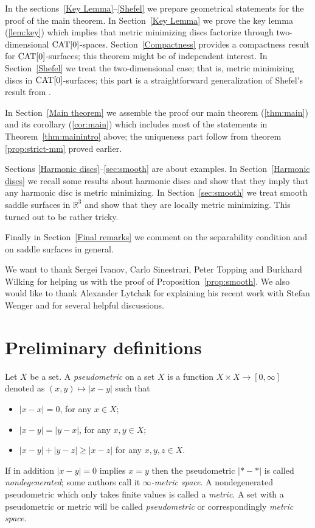 \documentclass{article}
\begin{document}
In the sections~\ref{Key Lemma}--\ref{Shefel} we prepare geometrical statements for the proof of the main theorem.
In Section~\ref{Key Lemma} we prove the key lemma (\ref{lem:key}) which implies that metric minimizing discs factorize through 
two-dimensional $\mathop{\rm CAT}\nolimits[0]$-spaces. 
Section~\ref{Compactness} provides a compactness result for $\mathop{\rm CAT}\nolimits[0]$-surfaces;
this theorem might be of independent interest. 
In Section~\ref{Shefel} we treat the two-dimensional case; 
that is, metric minimizing discs in $\mathop{\rm CAT}\nolimits[0]$-surfaces;
this part is a straightforward generalization of Shefel's result from \cite{shefel-2D}. 

In Section~\ref{Main theorem} we assemble the proof our main theorem (\ref{thm:main}) and its corollary (\ref{cor:main}) 
which includes most of the statements in Theorem~\ref{thm:mainintro} above; the uniqueness part follow from theorem \ref{prop:strict-mm} 
proved earlier.

Sections \ref{Harmonic discs}--\ref{sec:smooth} are about examples.
In Section~\ref{Harmonic discs} we recall some results about  harmonic discs and show that they imply that any harmonic disc is metric minimizing. 
In Section~\ref{sec:smooth} we treat smooth saddle surfaces in $\mathbb{R}^3$ and show that they are locally metric minimizing.
This turned out to be rather tricky.

Finally in Section~\ref{Final remarks} we comment on the separability condition and on saddle 
surfaces in general.

We want to thank 
Sergei Ivanov, 
Carlo Sinestrari, 
Peter Topping 
and Burkhard Wilking 
for helping us with the proof of Proposition~\ref{prop:smooth}.
We also would like to thank Alexander Lytchak for explaining his recent work with Stefan Wenger and for several helpful discussions.

\section{Preliminary definitions}\label{sec:Def}

Let $X$ be a set.
A \emph{pseudometric} on a set $X$ 
is a function $X\times X\to[0,\infty]$ denoted as $(x,y)\mapsto |x-y|$
such that 
\begin{itemize}
\item $|x-x|=0$, for any $x\in X$;
\item $|x-y|=|y-x|$, for any $x,y\in X$;
\item $|x-y|+|y-z|\ge|x-z|$ for any  $x,y,z\in X$.
\end{itemize}
If in addition $|x-y|=0$ implies $x=y$ then the pseudometric $|{*}-{*}|$ is called \emph{nondegenerated};
some authors call it \emph{$\infty$-metric space}.
A nondegenerated pseudometric which only takes finite values is called a \emph{metric}. 
A set with a pseudometric or metric will be called \emph{pseudometric} or correspondingly \emph{metric space}.
\end{document}
